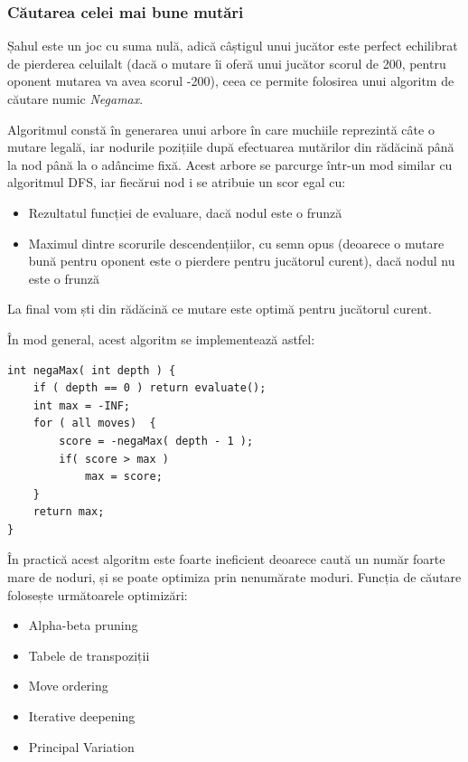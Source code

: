 \vspace{1cm}
\subsubsection{Căutarea celei mai bune mutări}
\vspace{1cm}

Șahul este un joc cu suma nulă, adică câștigul unui jucător este perfect echilibrat de
pierderea celuilalt (dacă o mutare îi oferă unui jucător scorul de 200, pentru oponent
mutarea va avea scorul -200), ceea ce permite folosirea unui algoritm de căutare
numic \textit{Negamax}.

Algoritmul constă în generarea unui arbore în care muchiile reprezintă câte o mutare legală,
iar nodurile pozițiile după efectuarea mutărilor din rădăcină până la nod până la o adâncime
fixă. Acest arbore se parcurge într-un mod similar cu algoritmul DFS, iar fiecărui nod i se
atribuie un scor egal cu:
\begin{itemize}
	\item Rezultatul funcției de evaluare, dacă nodul este o frunză
	\item Maximul dintre scorurile descendențiilor, cu semn opus (deoarece o mutare bună pentru
	      oponent este o pierdere pentru jucătorul curent), dacă nodul nu este o frunză
\end{itemize}
La final vom ști din rădăcină ce mutare este optimă pentru jucătorul curent.

\vspace{1cm}
În mod general, acest algoritm se implementează astfel:
\begin{lstlisting}[language=RustHtml]
int negaMax( int depth ) {
    if ( depth == 0 ) return evaluate();
    int max = -INF;
    for ( all moves)  {
        score = -negaMax( depth - 1 );
        if( score > max )
            max = score;
    }
    return max;
}
\end{lstlisting}
\vspace{1cm}

În practică acest algoritm este foarte ineficient deoarece caută un număr foarte mare de noduri,
și se poate optimiza prin nenumărate moduri. Funcția de căutare folosește următoarele optimizări:
\begin{itemize}
	\item Alpha-beta pruning
	\item Tabele de transpoziții
	\item Move ordering
	\item Iterative deepening
	\item Principal Variation
\end{itemize}

